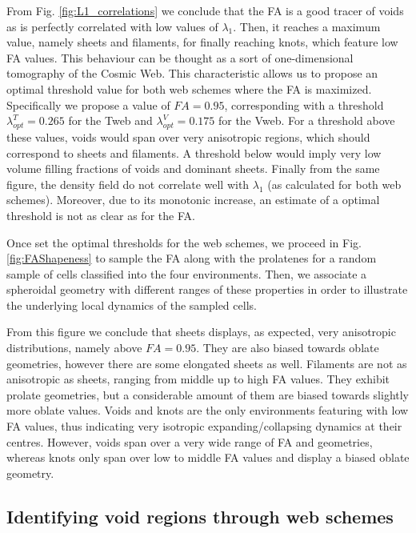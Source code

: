 \documentclass[a4,useAMS,usenatbib,usegraphicx]{latex/mn2e}
\begin{document}
From Fig. \ref{fig:L1_correlations} we conclude that the FA is a good
tracer of voids as is perfectly correlated with low values of $\lambda_1$. 
Then, it reaches a maximum value, namely sheets and filaments, for finally
reaching knots, which feature low FA values. This behaviour can be thought 
as a sort of one-dimensional tomography of the Cosmic Web. This 
characteristic allows us to propose an optimal threshold value for both 
web schemes where the FA is maximized. Specifically we propose a value of 
$FA=0.95$, corresponding with a threshold $\lambda_{opt}^T = 0.265$ for
the Tweb and $\lambda_{opt}^V = 0.175$ for the Vweb.  For a threshold 
above these values, voids would span over very anisotropic regions, which 
should correspond to sheets and filaments. A threshold below would imply 
very low volume filling fractions of voids and dominant sheets. Finally 
from the same figure, the density field do not correlate well with 
$\lambda_1$ (as calculated for both web schemes). Moreover, due to its 
monotonic increase, an estimate of a optimal threshold is not as clear as 
for the FA.


Once set the optimal thresholds for the web schemes, we proceed in Fig. 
\ref{fig:FAShapeness} to sample the FA along with the prolatenes for a 
random sample of cells classified into the four environments. Then, we 
associate a spheroidal geometry with different ranges of these properties
in order to illustrate the underlying local dynamics of the sampled cells.


From this figure we conclude that sheets displays, as expected, very 
anisotropic distributions, namely above $FA=0.95$. They are also biased 
towards oblate geometries, however there are some elongated sheets as 
well. Filaments are not as anisotropic as sheets, ranging from middle up 
to high FA values. They exhibit prolate geometries, but a considerable 
amount of them are biased towards slightly more oblate values. Voids and 
knots are the only environments featuring with low FA values, thus 
indicating very isotropic expanding/collapsing dynamics at their centres. 
However, voids span over a very wide range of FA and geometries, whereas 
knots only span over low to middle FA values and display a biased oblate 
geometry.


\subsection{Identifying void regions through web schemes}
\label{subsec:identification}
\end{document}
